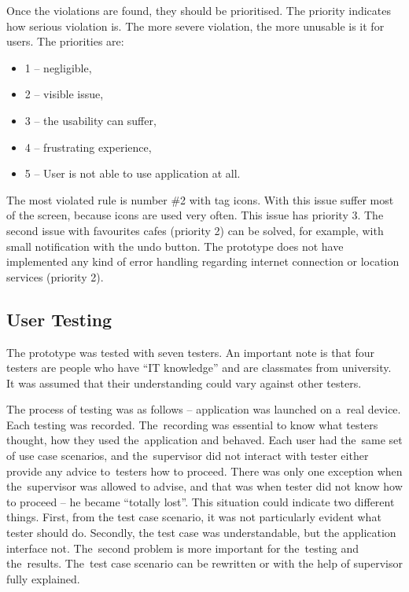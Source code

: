 Once the violations are found, they should be prioritised. The priority indicates how serious violation is. The more severe violation, the more unusable is it for users. The priorities are: 

\begin{itemize}
    \item 1 -- negligible,
    \item 2 -- visible issue,
    \item 3 -- the usability can suffer,
    \item 4 -- frustrating experience,
    \item 5 -- User is not able to use application at all.
\end{itemize}

The most violated rule is number \#2 with tag icons. With this issue suffer most of the screen, because icons are used very often.  This issue has priority 3.  The second issue with favourites cafes (priority 2) can be solved, for example, with small notification with the undo button. The prototype does not have implemented any kind of error handling regarding internet connection or location services (priority 2). 
\subsection{User Testing}
The prototype was tested with seven testers. An important note is that four testers are people who have ``IT knowledge'' and are classmates from university. It was assumed that their understanding could vary against other testers.

The process of testing was as follows -- application was launched on a~real device. Each testing was recorded. The~recording was essential to know what testers thought, how they used the~application and behaved. Each user had the~same set of use case scenarios, and the~supervisor did not interact with tester either provide any advice to~testers how to proceed. There was only one exception when the~supervisor was allowed to advise, and that was when tester did not know how to proceed -- he became ``totally lost''. This situation could indicate two different things. First, from the test case scenario, it was not particularly evident what tester should do. Secondly, the test case was understandable, but the application interface not. The~second problem is more important for the~testing and the~results. The~test case scenario can be rewritten or with the help of supervisor fully explained. 

